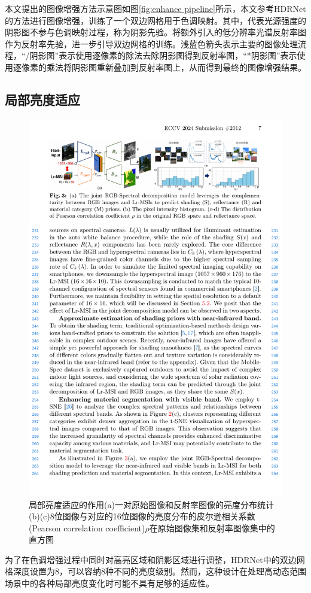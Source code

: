 \documentclass[
    type = master, %
    degree = academic,        %
    decl-page,  %
  ]{njuthesis}
\begin{document}
本文提出的图像增强方法示意图如图\ref{fig:enhance pipeline}所示，本文参考HDRNet的方法进行图像增强，训练了一个双边网格用于色调映射。其中，代表光源强度的阴影图不参与色调映射过程，称为阴影先验。将额外引入的低分辨率光谱反射率图作为反射率先验，进一步引导双边网格的训练。浅蓝色箭头表示主要的图像处理流程，“/阴影图”表示使用逐像素的除法去除阴影图得到反射率图，“*阴影图”表示使用逐像素的乘法将阴影图重新叠加到反射率图上，从而得到最终的图像增强结果。



\subsection{局部亮度适应}

\begin{figure}[h]
	\centering
	\includegraphics[width=1.0\linewidth]{docs/fig-chap3/fig-3-reflectance.pdf}
	\caption{局部亮度适应的作用\quad (a)一对原始图像和反射率图像的亮度分布统计\quad (b)(c)8位图像与对应的16位图像的亮度分布的皮尔逊相关系数(Pearson correlation coefficient)$ρ$在原始图像集和反射率图像集中的直方图}
	\label{fig:enhance reflectance}
\end{figure}
为了在色调增强过程中同时对高亮区域和阴影区域进行调整，HDRNet中的双边网格深度设置为8，可以容纳8种不同的亮度级别。然而，这种设计在处理高动态范围场景中的各种局部亮度变化时可能不具有足够的适应性。
\end{document}
